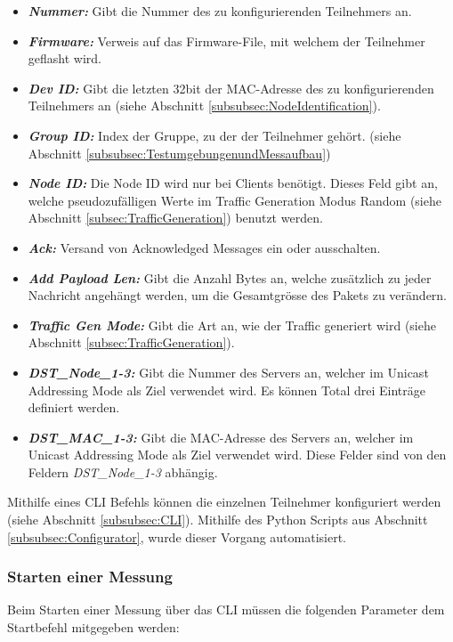 \begin{itemize}
	\item \textit{\textbf{Nummer:}} Gibt die Nummer des zu konfigurierenden Teilnehmers an.
	\item \textit{\textbf{Firmware:}} Verweis auf das Firmware-File, mit welchem der Teilnehmer geflasht wird.
	\item \textit{\textbf{Dev ID:}} Gibt die letzten 32bit der MAC-Adresse des zu konfigurierenden Teilnehmers an (siehe Abschnitt \ref{subsubsec:NodeIdentification}).
	\item \textit{\textbf{Group ID:}} Index der Gruppe, zu der der Teilnehmer gehört. (siehe Abschnitt \ref{subsubsec:TestumgebungenundMessaufbau})
	\item \textit{\textbf{Node ID:}} Die Node ID wird nur bei Clients benötigt. Dieses Feld gibt an, welche pseudozufälligen Werte im Traffic Generation Modus Random (siehe Abschnitt \ref{subsec:TrafficGeneration}) benutzt werden.
	\item \textit{\textbf{Ack:}} Versand von Acknowledged Messages ein oder ausschalten.
	\item \textit{\textbf{Add Payload Len:}} Gibt die Anzahl Bytes an, welche zusätzlich zu jeder Nachricht angehängt werden, um die Gesamtgrösse des Pakets zu verändern.
	\item \textit{\textbf{Traffic Gen Mode:}} Gibt die Art an, wie der Traffic generiert wird (siehe Abschnitt \ref{subsec:TrafficGeneration}).  
	\item \textit{\textbf{DST\_Node\_1-3:}} Gibt die Nummer des Servers an, welcher im Unicast Addressing Mode als Ziel verwendet wird. Es können Total drei Einträge definiert werden.  
	\item \textit{\textbf{DST\_MAC\_1-3:}} Gibt die MAC-Adresse des Servers an, welcher im Unicast Addressing Mode als Ziel verwendet wird. Diese Felder sind von den Feldern \textit{DST\_Node\_1-3} abhängig. 
\end{itemize}

Mithilfe eines CLI Befehls können die einzelnen Teilnehmer konfiguriert werden (siehe Abschnitt \ref{subsubsec:CLI}). Mithilfe des Python Scripts aus Abschnitt \ref{subsubsec:Configurator}, wurde dieser Vorgang automatisiert. 

\subsubsection{Starten einer Messung}\label{subsubsec:StartofMeassurment}
Beim Starten einer Messung über das CLI müssen die folgenden Parameter dem Startbefehl mitgegeben werden: 

